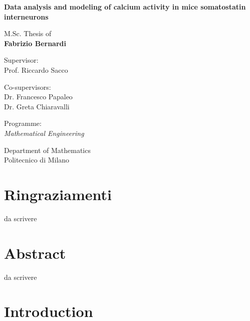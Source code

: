 \documentclass[12pt, a4paper]{report}
\newcommand{\myName}{Fabrizio Bernardi}
\newcommand{\myTitle}{Data analysis and modeling of calcium activity in   mice somatostatin interneurons}
\newcommand{\myDegree}{Programme: \protect\\ \textit{Mathematical Engineering}}
\newcommand{\myDepartment}{Department of Mathematics}
\newcommand{\myUni}{Politecnico di Milano}
\begin{document}
\begin{titlepage}
\begin{minipage}{\linewidth}
\begin{minipage}{0.45\linewidth}
\begin{figure}[H]
				\end{figure}
			\end{minipage}
		\end{minipage}
		
		\begin{addmargin}[1cm]{-1cm}
			\setlength{\parindent}{0pt}
			\vfill
			
			{\huge\bfseries\myTitle}
			
			\vspace{2cm}
			
			{\Large M.Sc. Thesis of\\[0.125cm]}
			{\LARGE\bfseries\myName}
			
			\vspace{1cm}
			
			\large
			Supervisor:\\[0.125cm]
			{\Large Prof. Riccardo Sacco}
			
			\vspace{0.5cm}
			
			\large
			Co-supervisors:\\[0.125cm]
			{\Large Dr. Francesco Papaleo \\
			Dr. Greta Chiaravalli}
			
			\vspace{2cm}
			
			\myDegree
			
			\vspace{0.5cm}
			
			\myDepartment \\
			\myUni
			
			\vfill
		\end{addmargin}
	\end{titlepage}
	
	
	
	\chapter*{Ringraziamenti}
	
	da scrivere


	
	\chapter*{Abstract}
	
	da scrivere
	
	\chapter*{Introduction}
	
\end{document}
